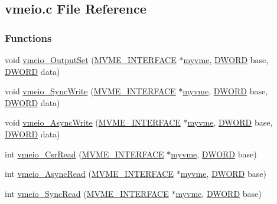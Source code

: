 \subsection{vmeio.c File Reference}
\label{vmeio_8c}
\subsubsection*{Functions}
\begin{DoxyCompactItemize}
\item 
void \hyperlink{vmeio_8c_a411b07826fc5b2a611b6f4f9b8e4cc9d}{vmeio\_\-OutputSet} (\hyperlink{structMVME__INTERFACE}{MVME\_\-INTERFACE} $\ast$\hyperlink{fevmemodules_8c_aeab89db2ad759342a32dcd50a0a0156c}{myvme}, \hyperlink{vt2_8h_a798af1e30bc65f319c1a246cecf59e39}{DWORD} base, \hyperlink{vt2_8h_a798af1e30bc65f319c1a246cecf59e39}{DWORD} data)
\item 
void \hyperlink{vmeio_8c_a703cba2e78c649e71061f29f56aea517}{vmeio\_\-SyncWrite} (\hyperlink{structMVME__INTERFACE}{MVME\_\-INTERFACE} $\ast$\hyperlink{fevmemodules_8c_aeab89db2ad759342a32dcd50a0a0156c}{myvme}, \hyperlink{vt2_8h_a798af1e30bc65f319c1a246cecf59e39}{DWORD} base, \hyperlink{vt2_8h_a798af1e30bc65f319c1a246cecf59e39}{DWORD} data)
\item 
void \hyperlink{vmeio_8c_a55bfbc8acc81f96641ce87521deb9f53}{vmeio\_\-AsyncWrite} (\hyperlink{structMVME__INTERFACE}{MVME\_\-INTERFACE} $\ast$\hyperlink{fevmemodules_8c_aeab89db2ad759342a32dcd50a0a0156c}{myvme}, \hyperlink{vt2_8h_a798af1e30bc65f319c1a246cecf59e39}{DWORD} base, \hyperlink{vt2_8h_a798af1e30bc65f319c1a246cecf59e39}{DWORD} data)
\item 
int \hyperlink{vmeio_8c_af6e6d51d02e674a8a2f313c12bf98a1b}{vmeio\_\-CsrRead} (\hyperlink{structMVME__INTERFACE}{MVME\_\-INTERFACE} $\ast$\hyperlink{fevmemodules_8c_aeab89db2ad759342a32dcd50a0a0156c}{myvme}, \hyperlink{vt2_8h_a798af1e30bc65f319c1a246cecf59e39}{DWORD} base)
\item 
int \hyperlink{vmeio_8c_a430d0ca0a0601d0f445fbc4e12f13af5}{vmeio\_\-AsyncRead} (\hyperlink{structMVME__INTERFACE}{MVME\_\-INTERFACE} $\ast$\hyperlink{fevmemodules_8c_aeab89db2ad759342a32dcd50a0a0156c}{myvme}, \hyperlink{vt2_8h_a798af1e30bc65f319c1a246cecf59e39}{DWORD} base)
\item 
int \hyperlink{vmeio_8c_a32066d5e2fc78836d5ac3dc4a70ac9af}{vmeio\_\-SyncRead} (\hyperlink{structMVME__INTERFACE}{MVME\_\-INTERFACE} $\ast$\hyperlink{fevmemodules_8c_aeab89db2ad759342a32dcd50a0a0156c}{myvme}, \hyperlink{vt2_8h_a798af1e30bc65f319c1a246cecf59e39}{DWORD} base)

\end{DoxyCompactItemize}
